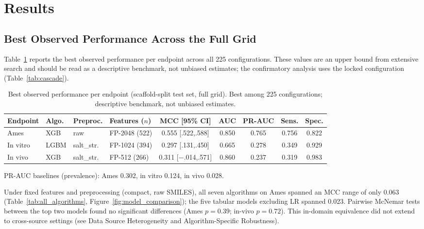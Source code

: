 \section{Results}

\subsection{Best Observed Performance Across the Full Grid}

Table~\ref{tab:best_models} reports the best observed performance per endpoint across all 
225 configurations. These values are an upper bound from extensive search and should be read 
as a descriptive benchmark, not unbiased estimates; the confirmatory analysis uses the locked 
configuration (Table~\ref{tab:cascade}).

\begin{table}[ht]
\caption{Best observed performance per endpoint (scaffold-split test set, full grid). Best 
among 225 configurations; descriptive benchmark, not unbiased estimates.}
\label{tab:best_models}
\centering
\small
\begin{tabular}{@{}llllccccc@{}}
\toprule
Endpoint & Algo. & Preproc. & Features ($n$) & MCC [95\% CI] & AUC & PR-AUC & Sens. & Spec. \\
\midrule
Ames     & XGB  & raw      & FP-2048 (522) & 0.555 [.522,.588]    & 0.850 & 0.765 & 0.756 & 0.822 \\
In vitro & LGBM & salt\_str. & FP-1024 (394) & 0.297 [.131,.450]  & 0.665 & 0.278 & 0.349 & 0.929 \\
In vivo  & XGB  & salt\_str. & FP-512 (266)  & 0.311 [$-$.014,.571] & 0.860 & 0.237 & 0.319 & 0.983 \\
\bottomrule
\end{tabular}

\medskip
\footnotesize
PR-AUC baselines (prevalence): Ames 0.302, in vitro 0.124, in vivo 0.028.
\end{table}

Under fixed features and preprocessing (compact, raw SMILES), all seven algorithms on Ames 
spanned an MCC range of only 0.063 (Table~\ref{tab:all_algorithms}, 
Figure~\ref{fig:model_comparison}); the five tabular models excluding LR spanned 0.023. 
Pairwise McNemar tests\cite{McNemar_1947} between the top two models found no significant 
differences (Ames $p = 0.39$; in-vivo $p = 0.72$). This in-domain equivalence did not 
extend to cross-source settings (see Data Source Heterogeneity and Algorithm-Specific Robustness).

